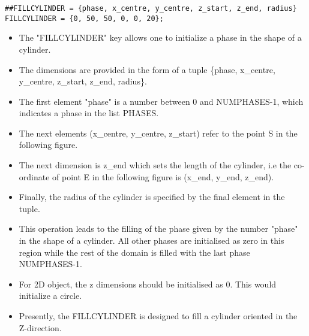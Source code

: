 \documentclass[a4paper,10pt]{article}
\begin{document}
\begin{lstlisting}
##FILLCYLINDER = {phase, x_centre, y_centre, z_start, z_end, radius}
FILLCYLINDER = {0, 50, 50, 0, 0, 20};
\end{lstlisting}

\begin{itemize}
 \item The "FILLCYLINDER" key allows one to initialize a phase in the shape of a cylinder.
 \item The dimensions are provided in the form of a tuple \{phase, x\_centre, y\_centre, z\_start, z\_end, radius\}.
 \item The first element "phase" is a number between 0 and NUMPHASES-1, which indicates a phase in the list PHASES.
 \item The next elements (x\_centre, y\_centre, z\_start) refer to the point S in the following figure.
 \item The next dimension is z\_end which sets the length of the cylinder, i.e the co-ordinate of point E in the following figure is (x\_end, y\_end, z\_end).
 \item Finally, the radius of the cylinder is specified by the final element in the tuple. 
 \item This operation leads to the filling of the phase given by the number "phase" in the shape of a cylinder. All other phases are initialised as zero in this region while the 
 rest of the domain is filled with the last phase NUMPHASES-1.
 \item For 2D object, the z dimensions should be initialised as 0. This would initialize a circle.
 \item Presently, the FILLCYLINDER is designed to fill a cylinder oriented in the Z-direction.
\end{itemize}


\end{document}
